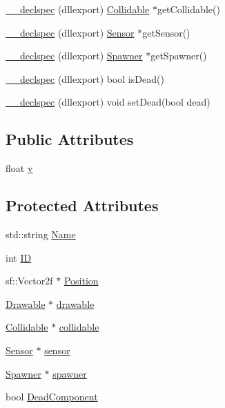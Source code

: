 \begin{DoxyCompactItemize}
\hyperlink{class_game_component_ae57117756a03743effd35b247b47128d}{\-\_\-\-\_\-declspec} (dllexport) \hyperlink{class_collidable}{Collidable} $\ast$get\-Collidable()
\item 
\hyperlink{class_game_component_a415eee32585e17c54627fd8e82bafda4}{\-\_\-\-\_\-declspec} (dllexport) \hyperlink{class_sensor}{Sensor} $\ast$get\-Sensor()
\item 
\hyperlink{class_game_component_a9b1178bf248e3249d13e56e49119012d}{\-\_\-\-\_\-declspec} (dllexport) \hyperlink{class_spawner}{Spawner} $\ast$get\-Spawner()
\item 
\hyperlink{class_game_component_a52514a034b067ce785a1be3f7fc20f2a}{\-\_\-\-\_\-declspec} (dllexport) bool is\-Dead()
\item 
\hyperlink{class_game_component_a5a034014ede12c085ba1b55d8fca6d1c}{\-\_\-\-\_\-declspec} (dllexport) void set\-Dead(bool dead)
\end{DoxyCompactItemize}
\subsection*{Public Attributes}
\begin{DoxyCompactItemize}
\item 
float \hyperlink{class_game_component_a8a40aa75eff388a7da06668d3d2fe87c}{y}
\end{DoxyCompactItemize}
\subsection*{Protected Attributes}
\begin{DoxyCompactItemize}
\item 
std\-::string \hyperlink{class_game_component_ab1037207fec65ac5fe65dec1e22f0566}{Name}
\item 
int \hyperlink{class_game_component_ac8d794e78280785eb956eaff044f74b2}{I\-D}
\item 
sf\-::\-Vector2f $\ast$ \hyperlink{class_game_component_acc3109bb4ae36112eb8796e067160c59}{Position}
\item 
\hyperlink{class_drawable}{Drawable} $\ast$ \hyperlink{class_game_component_acb73190345f4933825e9c8b8d5030438}{drawable}
\item 
\hyperlink{class_collidable}{Collidable} $\ast$ \hyperlink{class_game_component_aa91bd3600bd5964b55c7806dcfd1c862}{collidable}
\item 
\hyperlink{class_sensor}{Sensor} $\ast$ \hyperlink{class_game_component_ad585bf57df228afc83fbf777142e51bd}{sensor}
\item 
\hyperlink{class_spawner}{Spawner} $\ast$ \hyperlink{class_game_component_a15caaab21ec2e8eb9d438a25afbef4da}{spawner}
\item 
bool \hyperlink{class_game_component_a78058666ddc8662775b13b82e4b615a9}{Dead\-Component}
\end{DoxyCompactItemize}


